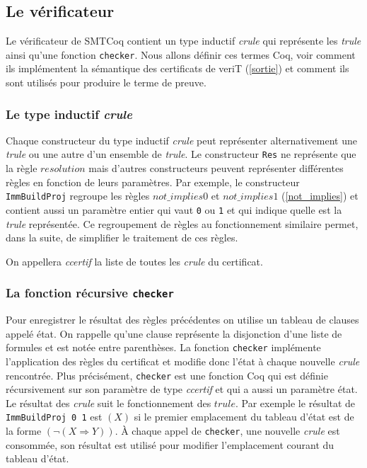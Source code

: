 \documentclass[11pt]{article}
\begin{document}
\subsection{Le vérificateur}

Le vérificateur de SMTCoq contient un type inductif \textit{crule} qui représente les \textit{trule} ainsi qu'une fonction \texttt{checker}. Nous allons définir ces termes Coq, voir comment ils implémentent la sémantique des certificats de veriT (\ref{sortie}) et comment ils sont utilisés pour produire le terme de preuve.


\subsubsection{Le type inductif \textit{crule}}\label{regroupement}


Chaque constructeur du type inductif \textit{crule} peut représenter alternativement une \textit{trule} ou une autre d'un ensemble de \textit{trule}. Le constructeur \texttt{Res} ne représente que la règle $resolution$ mais d'autres constructeurs peuvent représenter différentes règles en fonction de leurs paramètres. Par exemple, le constructeur \texttt{ImmBuildProj} regroupe les règles $not\_implies0$ et $not\_implies1$ (\ref{not_implies}) et contient aussi un paramètre entier qui vaut \texttt{0} ou \texttt{1} et qui indique quelle est la \textit{trule} représentée. Ce regroupement de règles au fonctionnement similaire permet, dans la suite, de simplifier le traitement de ces règles. \medbreak

On appellera \textit{ccertif} la liste de toutes les \textit{crule} du certificat.


\subsubsection{La fonction récursive \texttt{checker}} \label{checker}

Pour enregistrer le résultat des règles précédentes on utilise un tableau de clauses appelé état. On rappelle qu'une clause représente la disjonction d'une liste de formules et est notée  entre parenthèses. La fonction \texttt{checker} implémente l'application des règles du certificat et modifie donc l'état à chaque nouvelle \textit{crule} rencontrée. Plus précisément, \texttt{checker} est une fonction Coq qui est définie récursivement sur son paramètre de type \textit{ccertif} et qui a aussi un paramètre état. Le résultat des \textit{crule} suit le fonctionnement des $trule$. Par exemple le résultat de \texttt{ImmBuildProj 0 1} est $(X)$ si le premier emplacement du tableau d'état est de la forme $(\neg (X \Rightarrow Y))$. À chaque appel de \texttt{checker}, une nouvelle \textit{crule} est consommée, son résultat est utilisé pour modifier l'emplacement courant du tableau d'état.\medbreak
\end{document}
